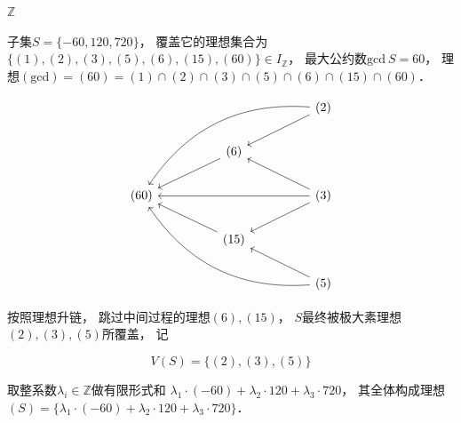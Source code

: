 \begin{example}{$\mathbb Z$}

子集$S=\{ -60, 120, 720 \}$，
覆盖它的理想集合为$\{(1),(2),(3),(5),(6),(15),(60)\} \in I_\mathbb Z$，
最大公约数$\text{gcd} \ S = 60$，
理想$(\text{gcd}) = (60) = (1)\cap(2)\cap(3)\cap(5)\cap(6)\cap(15)\cap(60)$．

$$
\begin{tikzcd}
     &  &                  &  & (2) \arrow[lld] \arrow[lllldd, bend right] \\
     &  & (6) \arrow[lld]  &  &                                            \\
(60) &  &                  &  & (3) \arrow[llu] \arrow[lld] \arrow[llll]   \\
     &  & (15) \arrow[llu] &  &                                            \\
     &  &                  &  & (5) \arrow[llu] \arrow[lllluu, bend left] 
\end{tikzcd}
$$

按照理想升链，
跳过中间过程的理想$(6),(15)$，
$S$最终被极大素理想$(2),(3),(5)$所覆盖，
记

$$
V(S) = \{(2),(3),(5)\}
$$

取整系数$\lambda_i\in \mathbb Z$做有限形式和
$\lambda_1 \cdot (-60) + \lambda_2 \cdot 120 + \lambda_3 \cdot 720$，
其全体构成理想$(S) = \{ \lambda_1 \cdot (-60) + \lambda_2 \cdot 120 + \lambda_3 \cdot 720 \}$．

\end{example}

